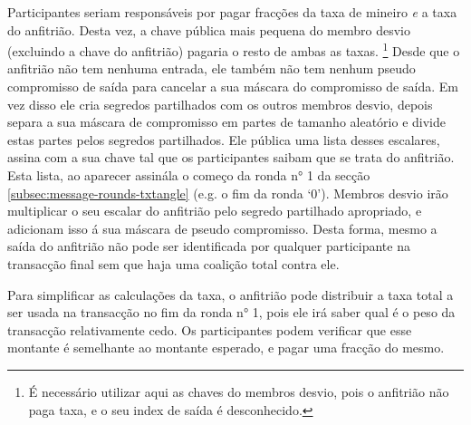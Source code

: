 Participantes seriam responsáveis por pagar fracções da taxa de mineiro {\em e} a taxa do anfitrião. Desta vez, a chave pública mais pequena do membro desvio (excluindo a chave do anfitrião) pagaria o resto de ambas as taxas. 
\footnote{É necessário utilizar aqui as chaves do membros desvio, pois o anfitrião não paga taxa, e o seu index de saída é desconhecido.}
Desde que o anfitrião não tem nenhuma entrada, ele também não tem nenhum pseudo compromisso de saída para cancelar a sua máscara do compromisso de saída. Em vez disso ele cria segredos partilhados com os outros membros desvio, depois separa a sua máscara de compromisso em partes de tamanho aleatório e divide estas partes pelos segredos partilhados. Ele pública uma lista desses escalares, assina com a sua chave tal que os participantes saibam que se trata do anfitrião. Esta lista, ao aparecer assinála o começo da ronda n° 1 da secção \ref{subsec:message-rounds-txtangle} (e.g. o fim da ronda `0'). Membros desvio irão multiplicar o seu escalar do anfitrião pelo segredo partilhado apropriado, e adicionam isso á sua máscara de pseudo compromisso. Desta forma, mesmo a saída do anfitrião não pode ser identificada por qualquer participante na transacção final sem que haja uma coalição total contra ele.       

Para simplificar as calculações da taxa, o anfitrião pode distribuir a taxa total a ser usada na transacção no fim da ronda n° 1, pois ele irá saber qual é o peso da transacção relativamente cedo. Os participantes podem verificar que esse montante é semelhante ao montante esperado, e pagar uma fracção do mesmo.  

